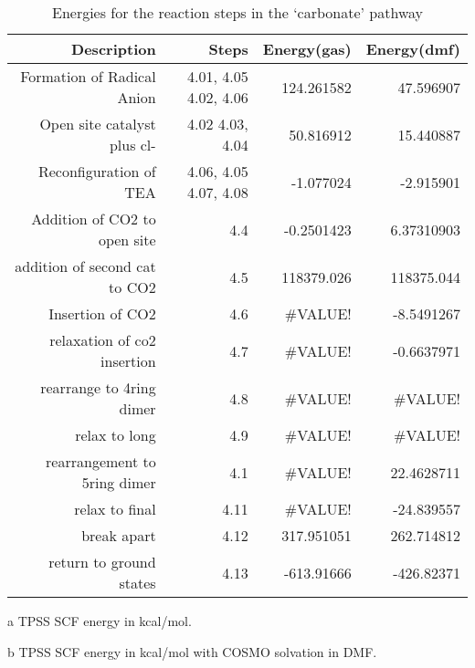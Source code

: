 \begin{table}[!htb]
\centering
 \begin{threeparttable}
  \caption{Energies for the reaction steps in the `carbonate' pathway}
    \begin{tabular}{rrrr}
    \toprule
    Description & Steps & Energy(gas)\tnote{a} & Energy(dmf)\tnote{b} \\
    \midrule
    Formation of Radical Anion & 4.01, 4.05 \ce{->} 4.02, 4.06   & 124.261582 & 47.596907 \\
    Open site catalyst plus cl- & 4.02 \ce{->} 4.03, 4.04 & 50.816912 & 15.440887 \\
    Reconfiguration of TEA & 4.06, 4.05 \ce{->} 4.07, 4.08 & -1.077024 & -2.915901 \\
    \midrule
    Addition of CO2 to open site & 4.4   & -0.2501423 & 6.37310903 \\
    addition of second cat to CO2 & 4.5   & 118379.026 & 118375.044 \\
    Insertion of CO2 & 4.6   & \#VALUE! & -8.5491267 \\
    relaxation of co2 insertion & 4.7   & \#VALUE! & -0.6637971 \\
    rearrange to 4ring dimer & 4.8   & \#VALUE! & \#VALUE! \\
    relax to long & 4.9   & \#VALUE! & \#VALUE! \\
    rearrangement to 5ring dimer & 4.1   & \#VALUE! & 22.4628711 \\
    relax to final & 4.11  & \#VALUE! & -24.839557 \\
    break apart & 4.12  & 317.951051 & 262.714812 \\
    return to ground states & 4.13  & -613.91666 & -426.82371 \\
    \bottomrule
    \end{tabular}%
    \begin{tablenotes}
    \item [a] TPSS SCF energy in kcal/mol.
    \item [b] TPSS SCF energy in kcal/mol with COSMO solvation in DMF.
    \end{tablenotes}
  \label{tab.carbrxn}%
 \end{threeparttable}
\end{table}%
